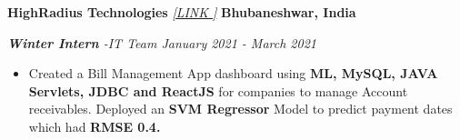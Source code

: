\textbf{HighRadius Technologies}
\href{https://drive.google.com/drive/folders/1rA9693s6voPt4b0kTJUPlP4XZ9j3zxVo?usp=sharing}{\textit{[LINK  {\faExternalLinkSquare}]}}
\hfill  {\faMapMarker} \textbf{Bhubaneshwar, India} 
\par
\textit{\textbf{Winter Intern} -IT Team\hfill {\faCalendar} January 2021 - March 2021} \par
\begin{itemize}
	\item Created a Bill Management App dashboard using \textbf{ML, MySQL, JAVA Servlets, JDBC and ReactJS} for companies to manage Account receivables. Deployed an \textbf{SVM Regressor} Model to predict payment dates which had \textbf{RMSE 0.4.}
\end{itemize}\vspace{0.1cm} \par
